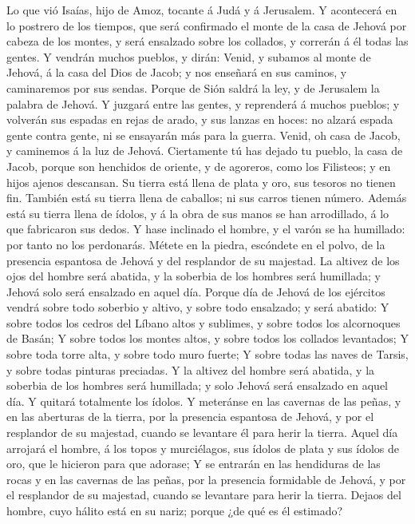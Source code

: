  Lo que vió Isaías, hijo de Amoz, tocante á Judá y á
Jerusalem.  Y acontecerá en lo postrero de los tiempos,
que será confirmado el monte de la casa de Jehová por cabeza de los
montes, y será ensalzado sobre los collados, y correrán á él todas las
gentes.  Y vendrán muchos pueblos, y dirán: Venid, y
subamos al monte de Jehová, á la casa del Dios de Jacob; y nos enseñará
en sus caminos, y caminaremos por sus sendas. Porque de Sión saldrá la
ley, y de Jerusalem la palabra de Jehová.  Y juzgará entre
las gentes, y reprenderá á muchos pueblos; y volverán sus espadas en
rejas de arado, y sus lanzas en hoces: no alzará espada gente contra
gente, ni se ensayarán más para la guerra.  Venid, oh casa
de Jacob, y caminemos á la luz de Jehová.  Ciertamente tú
has dejado tu pueblo, la casa de Jacob, porque son henchidos de oriente,
y de agoreros, como los Filisteos; y en hijos ajenos descansan.
 Su tierra está llena de plata y oro, sus tesoros no
tienen fin. También está su tierra llena de caballos; ni sus carros
tienen número.  Además está su tierra llena de ídolos, y á
la obra de sus manos se han arrodillado, á lo que fabricaron sus dedos.
 Y hase inclinado el hombre, y el varón se ha humillado:
por tanto no los perdonarás.  Métete en la piedra,
escóndete en el polvo, de la presencia espantosa de Jehová y del
resplandor de su majestad.  La altivez de los ojos del
hombre será abatida, y la soberbia de los hombres será humillada; y
Jehová solo será ensalzado en aquel día.  Porque día de
Jehová de los ejércitos vendrá sobre todo soberbio y altivo, y sobre
todo ensalzado; y será abatido:  Y sobre todos los cedros
del Líbano altos y sublimes, y sobre todos los alcornoques de Basán;
 Y sobre todos los montes altos, y sobre todos los
collados levantados;  Y sobre toda torre alta, y sobre
todo muro fuerte;  Y sobre todas las naves de Tarsis, y
sobre todas pinturas preciadas.  Y la altivez del hombre
será abatida, y la soberbia de los hombres será humillada; y solo Jehová
será ensalzado en aquel día.  Y quitará totalmente los
ídolos.  Y meteránse en las cavernas de las peñas, y en
las aberturas de la tierra, por la presencia espantosa de Jehová, y por
el resplandor de su majestad, cuando se levantare él para herir la
tierra.  Aquel día arrojará el hombre, á los topos y
murciélagos, sus ídolos de plata y sus ídolos de oro, que le hicieron
para que adorase;  Y se entrarán en las hendiduras de las
rocas y en las cavernas de las peñas, por la presencia formidable de
Jehová, y por el resplandor de su majestad, cuando se levantare para
herir la tierra.  Dejaos del hombre, cuyo hálito está en
su nariz; porque ¿de qué es él estimado?

